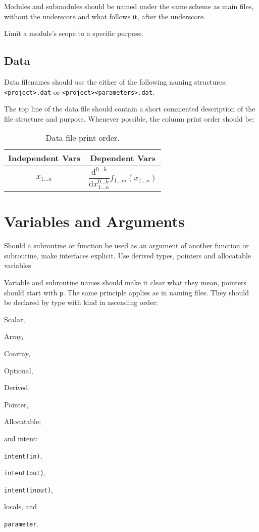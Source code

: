 \documentclass[11pt,a4paper]{article}
\begin{document}
		Modules and submodules should be named under the same scheme as main files, without the underscore and what follows it, after the underscore.
		
		Limit a module's scope to a specific purpose.
		\subsection{Data}
		Data filenames should use the either of the following naming structures: \texttt{<project>.dat} or \texttt{<project>\textunderscore <parameters>.dat}.
		
		The top line of the data file should contain a short commented description of the file structure and purpose. Whenever possible, the column print order should be:
		\begin{table}
			\centering
			\caption{Data file print order.}
			\label{t:dfpo}
			\begin{tabular}{cc}
			\toprule
			Independent Vars & Dependent Vars \\
			\midrule
			$ x_{1 \ldots n} $ & $ \dfrac{\mathrm{d}^{0 \ldots k} }{\mathrm{d} x_{1 \ldots n}^{0\ldots k}} f_{1 \ldots m}(x_{1 \ldots n}) $ \\
			\bottomrule
			\end{tabular}
		\end{table}
	\section{Variables and Arguments}
	Should a subroutine or function be used as an argument of another function or subroutine, make interfaces explicit. Use derived types, pointers and allocatable variables
	
	Variable and subroutine names should make it clear what they mean, pointers should start with \texttt{p\textunderscore}. The same principle applies as in naming files. They should be declared by type with kind in ascending order:
	\begin{inparaenum}[\itshape 1\upshape )]
		\item Scalar,
		\item Array,
		\item Coarray,
		\item Optional,
		\item Derived,
		\item Pointer,
		\item Allocatable;
	\end{inparaenum}
	and intent: 
	\begin{inparaenum}[\itshape 1\upshape )]
		\item \texttt{intent(in)},
		\item \texttt{intent(out)},
		\item \texttt{intent(inout)},
		\item locals, and
		\item \texttt{parameter}.
	\end{inparaenum}
\end{document}
